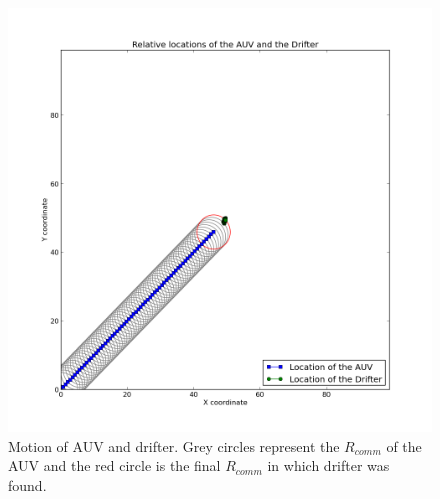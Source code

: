 \documentclass[a4paper, 11pt]{article} %
\begin{document}
\begin{figure}[H]
	\begin{center}
		\includegraphics[scale=0.30]{basic_1.png}
	\end{center}
\caption{Motion of AUV and drifter. Grey circles represent the $R_{comm}$ of the AUV and the red circle is the final $R_{comm}$ in which drifter was found. \label{basicAUVDrifer}}
\end{figure}
\end{document}
